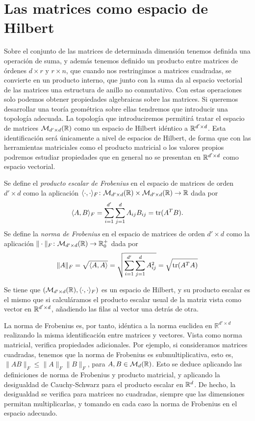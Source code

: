 \section{Las matrices como espacio de Hilbert}

Sobre el conjunto de las matrices de determinada dimensión tenemos definida una operación de suma, y además tenemos definido un producto entre matrices de órdenes $d \times r$ y $r \times n$, que cuando nos restringimos a matrices cuadradas, se convierte en un producto interno, que junto con la suma da al espacio vectorial de las matrices una estructura de anillo no conmutativo. Con estas operaciones solo podemos obtener propiedades algebraicas sobre las matrices. Si queremos desarrollar una teoría geométrica sobre ellas tendremos que introducir una topología adecuada. La topología que introduciremos permitirá tratar el espacio de matrices $\mathcal{M}_{d'\times d}(\mathbb{R})$ como un espacio de Hilbert idéntico a $\mathbb{R}^{d'\times d}$. Esta identificación será únicamente a nivel de espacios de Hilbert, de forma que con las herramientas matriciales como el producto matricial o los valores propios podremos estudiar propiedades que en general no se presentan en $\mathbb{R}^{d'\times d}$ como espacio vectorial.

\begin{definition}
    Se define el \emph{producto escalar de Frobenius} en el espacio de matrices de orden $d' \times d$ como la aplicación $\langle \cdot, \cdot \rangle_F \colon \mathcal{M}_{d' \times d}(\mathbb{R}) \times \mathcal{M}_{d' \times d}(\mathbb{R}) \to \mathbb{R}$ dada por
    \[ \langle A, B \rangle_F = \sum_{i=1}^{d'}\sum_{j=1}^{d} A_{ij}B_{ij} = \operatorname{tr}(A^TB). \]
    Se define la \emph{norma de Frobenius} en el espacio de matrices de orden $d' \times d$ como la aplicación $\|\cdot \|_F \colon \mathcal{M}_{d' \times d}(\mathbb{R}) \to \mathbb{R}^+_0$ dada por
    \[ \|A\|_F = \sqrt{\langle A, A \rangle} = \sqrt{\sum_{i=1}^{d'}\sum_{j=1}^{d}A_{ij}^2} = \sqrt{\operatorname{tr}(A^TA)} \]
\end{definition}

Se tiene que $(\mathcal{M}_{d'\times d}(\mathbb{R}),\langle \cdot, \cdot \rangle_F)$ es un espacio de Hilbert, y su producto escalar es el mismo que si calculáramos el producto escalar usual de la matriz vista como vector en $\mathbb{R}^{d' \times d}$, añadiendo las filas al vector una detrás de otra.

La norma de Frobenius es, por tanto, idéntica a la norma euclidea en $\mathbb{R}^{d'\times d}$ realizando la misma identificación entre matrices y vectores. Vista como norma matricial, verifica propiedades adicionales. Por ejemplo, si consideramos matrices cuadradas, tenemos que la norma de Frobenius es submultiplicativa, esto es, $\|AB\|_F \le \|A\|_F\|B\|_F$, para $A, B \in \mathcal{M}_d(\mathbb{R})$. Esto se deduce aplicando las definiciones de norma de Frobenius y producto matricial, y aplicando la desigualdad de Cauchy-Schwarz para el producto escalar en $\mathbb{R}^d$. De hecho, la desigualdad se verifica para matrices no cuadradas, siempre que las dimensiones permitan multiplicarlas, y tomando en cada caso la norma de Frobenius en el espacio adecuado.

